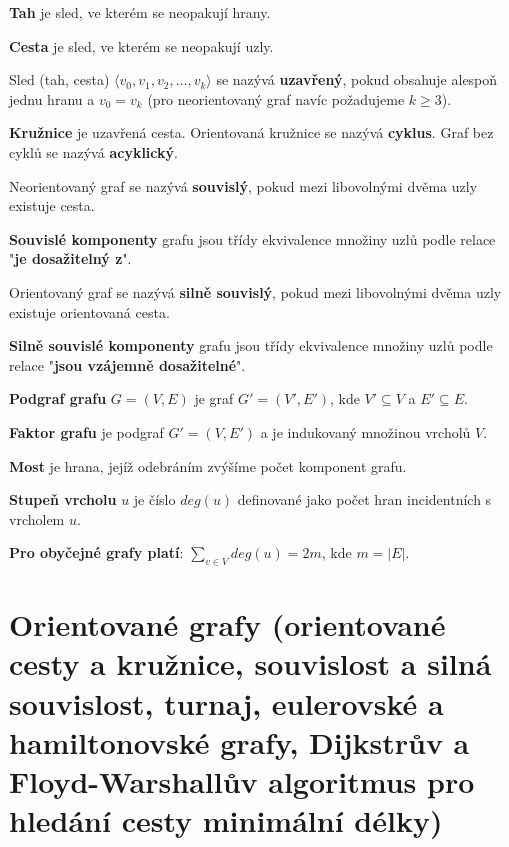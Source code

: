 \documentclass[11pt,a4paper]{article}
\begin{document}
\textbf{Tah} je sled, ve kterém se neopakují hrany.

\textbf{Cesta} je sled, ve kterém se neopakují uzly.

Sled (tah, cesta) $\langle v_0, v_1, v_2, \dots, v_k\rangle$ se nazývá \textbf{uzavřený}, pokud obsahuje alespoň jednu hranu a $v_0 = v_k$ (pro neorientovaný graf navíc požadujeme $k \geq 3$).

\textbf{Kružnice} je uzavřená cesta. Orientovaná kružnice se nazývá \textbf{cyklus}. Graf bez cyklů se nazývá \textbf{acyklický}.

Neorientovaný graf se nazývá \textbf{souvislý}, pokud mezi libovolnými dvěma uzly existuje cesta.

\textbf{Souvislé komponenty} grafu jsou třídy ekvivalence množiny uzlů podle relace "\textbf{je dosažitelný z}".

Orientovaný graf se nazývá \textbf{silně souvislý}, pokud mezi libovolnými dvěma uzly existuje orientovaná cesta.

\textbf{Silně souvislé komponenty} grafu jsou třídy ekvivalence množiny uzlů podle relace "\textbf{jsou vzájemně dosažitelné}".

\textbf{Podgraf grafu} $G = (V, E)$ je graf $G' = (V', E')$, kde $V' \subseteq V$ a $E' \subseteq E$.

\textbf{Faktor grafu} je podgraf $G' = (V, E')$ a je indukovaný množinou vrcholů $V$.

\textbf{Most} je hrana, jejíž odebráním zvýšíme počet komponent grafu.

\textbf{Stupeň vrcholu} $u$ je číslo $deg(u)$ definované jako počet hran incidentních s vrcholem $u$.

\textbf{Pro obyčejné grafy platí}: $\sum_{v \in V} deg(u) = 2m$, kde $m = |E|$.
\section{Orientované grafy (orientované cesty a kružnice, souvislost a silná souvislost, turnaj, eulerovské a hamiltonovské grafy, Dijkstrův a Floyd-Warshallův algoritmus pro hledání cesty minimální délky)}
\end{document}
